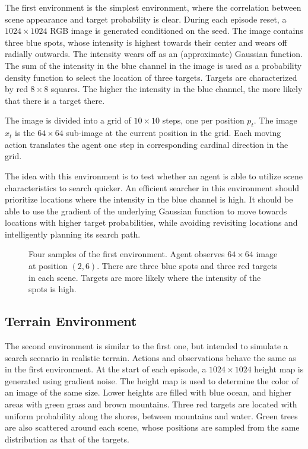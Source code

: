 The first environment is the simplest environment, where the correlation between scene appearance and target probability is clear.
During each episode reset, a \(1024 \times 1024\) RGB image is generated conditioned on the seed.
The image contains three blue spots, whose intensity is highest towards their center and wears off radially outwards.
The intensity wears off as an (approximate) Gaussian function.
The sum of the intensity in the blue channel in the image is used as a probability density function to select the location of three targets.
Targets are characterized by red \(8 \times 8\) squares.
The higher the intensity in the blue channel, the more likely that there is a target there.

The image is divided into a grid of \(10 \times 10\) steps, one per position \(p_t\).
The image \(x_t\) is the \(64 \times 64\) sub-image at the current position in the grid.
Each moving action translates the agent one step in corresponding cardinal direction in the grid.

The idea with this environment is to test whether an agent is able to utilize scene characteristics to search quicker.
An efficient searcher in this environment should prioritize locations where the intensity in the blue channel is high.
It should be able to use the gradient of the underlying Gaussian function to move towards locations with higher target probabilities, while avoiding revisiting locations and intelligently planning its search path.

\begin{figure}
    \centering
    
    \caption[Gaussian environment]{Four samples of the first environment. Agent observes \(64 \times 64\) image at position \((2, 6)\). There are three blue spots and three red targets in each scene. Targets are more likely where the intensity of the spots is high.}
    \label{fig:gaussian}
\end{figure}

\subsection{Terrain Environment}

The second environment is similar to the first one, but intended to simulate a search scenario in realistic terrain.
Actions and observations behave the same as in the first environment.
At the start of each episode, a \(1024 \times 1024\) height map is generated using gradient noise.
The height map is used to determine the color of an image of the same size.
Lower heights are filled with blue ocean, and higher areas with green grass and brown mountains.
Three red targets are located with uniform probability along the shores, between mountains and water.
Green trees are also scattered around each scene, whose positions are sampled from the same distribution as that of the targets.

